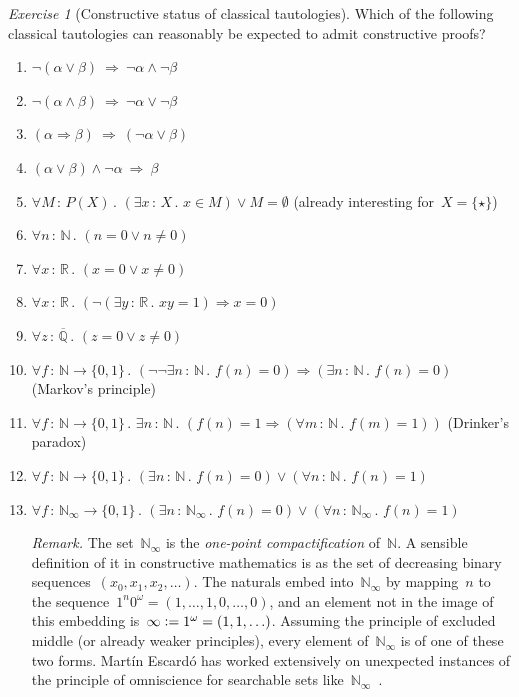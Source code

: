 \documentclass[10pt,reqno,a4paper,openany]{amsbook}
\theoremstyle{definition}
\theoremstyle{plain}
\theoremstyle{remark}
\newcommand{\NN}{\mathbb{N}}
\newcommand{\RR}{\mathbb{R}}
\newcommand{\QQ}{\mathbb{Q}}
\newcommand{\?}{\,{:}\,}
\renewcommand{\_}{\mathpunct{.}\,}
\newcommand{\defeq}{\vcentcolon=}
\newtheorem{exercise}[defn]{Exercise}
\begin{document}
\begin{exercise}[Constructive status of classical tautologies]\label{ex:tautologies}
Which of the following classical tautologies can reasonably be expected to
admit constructive proofs?
\begin{enumerate}
\item $\neg(\alpha \vee \beta) \ \Longrightarrow\ \neg\alpha \wedge \neg\beta$
\item $\neg(\alpha \wedge \beta) \ \Longrightarrow\ \neg\alpha \vee \neg\beta$
\item $(\alpha \Rightarrow \beta) \ \Longrightarrow\ (\neg\alpha \vee \beta)$
\item $(\alpha \vee \beta) \wedge \neg\alpha \ \Longrightarrow\ \beta$
\item $\forall M\?P(X)\_ (\exists x\?X\_ x \in M) \vee M = \emptyset$
(already interesting for~$X = \{\star\}$)
\item $\forall n\?\NN\_ (n = 0 \vee n \neq 0)$
\item $\forall x\?\RR\_ (x = 0 \vee x \neq 0)$
\item $\forall x\?\RR\_ (\neg(\exists y\?\RR\_ xy=1) \Rightarrow x = 0)$
\item $\forall z\?\overline{\QQ}\_ (z = 0 \vee z \neq 0)$
\item $\forall f \? \NN \to \{0,1\}\_ (\neg\neg\exists n \? \NN\_ f(n) = 0)
\Rightarrow (\exists n \? \NN\_ f(n) = 0)$ (Markov's principle)
\item $\forall f \? \NN \to \{0,1\}\_ \exists n \? \NN\_ (f(n) = 1
\Rightarrow (\forall m \? \NN\_ f(m) = 1))$ (Drinker's paradox)
\item $\forall f \? \NN \to \{0,1\}\_ (\exists n \? \NN\_ f(n) = 0) \vee
(\forall n \? \NN\_ f(n) = 1)$
\item $\forall f \? \NN_\infty \to \{0,1\}\_ (\exists n \? \NN_\infty\_ f(n) = 0) \vee
(\forall n \? \NN_\infty\_ f(n) = 1)$

{\noindent\scriptsize\emph{Remark.} The set~$\NN_\infty$ is the \emph{one-point
compactification} of~$\NN$. A sensible definition of it in constructive mathematics
is as the set of decreasing binary sequences~$(x_0,x_1,x_2,\ldots)$. The
naturals embed into~$\NN_\infty$ by mapping~$n$ to the sequence~$1^n 0^\omega =
(1,\ldots,1,0,\ldots,0)$, and an element not in the image of this embedding
is~$\infty \defeq 1^\omega = (1,1,\ldots)$. Assuming the principle of excluded
middle (or already weaker principles), every element of~$\NN_\infty$ is of one
of these two forms. Martín Escardó has worked extensively on unexpected
instances of the principle of omniscience for searchable sets
like~$\NN_\infty$~\cite{escardo:omniscience1,escardo:omniscience2,escardo:omniscience}.\par}
\end{enumerate}
\end{exercise}
\end{document}
